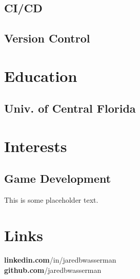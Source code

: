 \documentclass[letterpaper]{resume}
\begin{document}
\begin{minipage}[t]{0.33\textwidth}
\subsection{CI/CD}

\subsection{Version Control}

\sectionspace %


\section{Education}

\subsection{Univ. of Central Florida}

\sectionspace %


\section{Interests}

\subsection{Game Development}
This is some placeholder text.

\sectionspace %


\section{Links}
{\bf linkedin.com}/in/jaredbwasserman \\
{\bf github.com}/jaredbwasserman

\sectionspace %


\end{minipage} %
\end{document}
